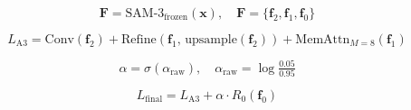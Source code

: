 
\begin{equation}
  \mathbf{F} = \mathrm{SAM\text{-}3}_{\text{frozen}}(\mathbf{x}),\quad
  \mathbf{F} = \{\mathbf{f}_2, \mathbf{f}_1, \mathbf{f}_0\}
  \label{eq:fpn}
\end{equation}

\begin{equation}
  L_{\text{A3}} = \mathrm{Conv}(\mathbf{f}_2) + \mathrm{Refine}(\mathbf{f}_1,\, \mathrm{upsample}(\mathbf{f}_2))
                 + \mathrm{MemAttn}_{M=8}(\mathbf{f}_1)
  \label{eq:a3}
\end{equation}

\begin{equation}
  \alpha = \sigma(\alpha_{\mathrm{raw}}),\quad \alpha_{\mathrm{raw}} = \log\!\tfrac{0.05}{0.95}
  \label{eq:alpha_init}
\end{equation}

\begin{equation}
  L_{\text{final}} = L_{\text{A3}} + \alpha \cdot R_0(\mathbf{f}_0)
  \label{eq:final}
\end{equation}
